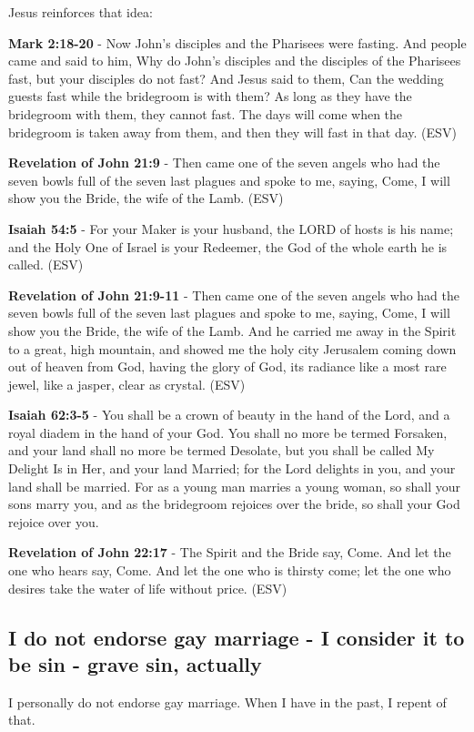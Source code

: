 \documentclass[11pt]{article}
\begin{document}
Jesus reinforces that idea:

\textbf{Mark 2:18-20} - Now John's disciples and the Pharisees were fasting. And people came and said to him, Why do John's disciples and the disciples of the Pharisees fast, but your disciples do not fast? And Jesus said to them, Can the wedding guests fast while the bridegroom is with them? As long as they have the bridegroom with them, they cannot fast. The days will come when the bridegroom is taken away from them, and then they will fast in that day. (ESV)

\textbf{Revelation of John 21:9} - Then came one of the seven angels who had the seven bowls full of the seven last plagues and spoke to me, saying, Come, I will show you the Bride, the wife of the Lamb. (ESV)

\textbf{Isaiah 54:5} - For your Maker is your husband, the LORD of hosts is his name; and the Holy One of Israel is your Redeemer, the God of the whole earth he is called. (ESV)

\textbf{Revelation of John 21:9-11} - Then came one of the seven angels who had the seven bowls full of the seven last plagues and spoke to me, saying, Come, I will show you the Bride, the wife of the Lamb. And he carried me away in the Spirit to a great, high mountain, and showed me the holy city Jerusalem coming down out of heaven from God, having the glory of God, its radiance like a most rare jewel, like a jasper, clear as crystal. (ESV)

\textbf{Isaiah 62:3-5} - You shall be a crown of beauty in the hand of the Lord, and a royal diadem in the hand of your God. You shall no more be termed Forsaken, and your land shall no more be termed Desolate, but you shall be called My Delight Is in Her, and your land Married; for the Lord delights in you, and your land shall be married. For as a young man marries a young woman, so shall your sons marry you, and as the bridegroom rejoices over the bride, so shall your God rejoice over you.

\textbf{Revelation of John 22:17} - The Spirit and the Bride say, Come. And let the one who hears say, Come. And let the one who is thirsty come; let the one who desires take the water of life without price. (ESV)

\subsection{I do not endorse gay marriage - I consider it to be sin - grave sin, actually}
\label{sec:org7b594c1}
I personally do not endorse gay marriage. When I have in the past, I repent of that.
\end{document}
